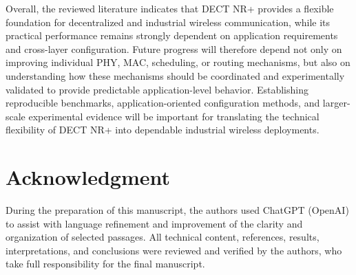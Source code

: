 Overall, the reviewed literature indicates that DECT NR+ provides a flexible foundation for decentralized and industrial wireless communication, while its practical performance remains strongly dependent on application requirements and cross-layer configuration. Future progress will therefore depend not only on improving individual PHY, MAC, scheduling, or routing mechanisms, but also on understanding how these mechanisms should be coordinated and experimentally validated to provide predictable application-level behavior. Establishing reproducible benchmarks, application-oriented configuration methods, and larger-scale experimental evidence will be important for translating the technical flexibility of DECT NR+ into dependable industrial wireless deployments.

\section*{Acknowledgment}

During the preparation of this manuscript, the authors used ChatGPT (OpenAI) to assist with language refinement and improvement of the clarity and organization of selected passages. All technical content, references, results, interpretations, and conclusions were reviewed and verified by the authors, who take full responsibility for the final manuscript.